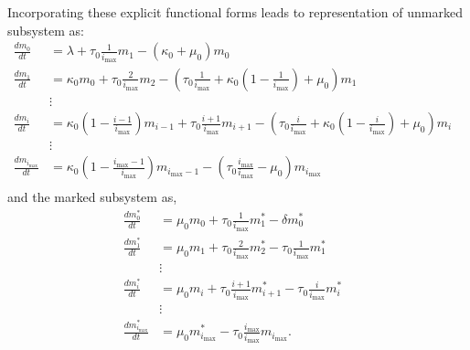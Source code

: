 \documentclass[review]{elsarticle}
\newcommand{\imax}{\ensuremath{i_{\max}}\xspace}
\begin{document}
Incorporating these explicit functional forms leads to representation of unmarked subsystem as: %
\begin{align*}
\frac{dm_{0}}{dt} &= \lambda+\tau_0\frac{1}{\imax} m_{1}-\left(\kappa_0 +\mu_0\right) m_{0} \\
\frac{dm_{1}}{dt} &= \kappa_0 m_{0}+\tau_0\frac{2}{\imax} m_{2}-\left(\tau_0\frac{1}{\imax} +\kappa_0\left(1-\frac{1}{\imax}\right) +\mu_0\right) m_{1}\\
& \vdots & \\
\frac{dm_{i}}{dt} &= \kappa_0\left(1-\frac{i-1}{\imax}\right) m_{i-1}+\tau_0\frac{i+1}{\imax} m_{i+1}-\left(\tau_0\frac{i}{\imax}+\kappa_0\left(1-\frac{i}{\imax}\right) + \mu_0\right) m_{i} \\
& \vdots & \\
\frac{dm_{\imax}}{dt} &= \kappa_0\left(1-\frac{\imax-1}{\imax}\right) m_{\imax-1}-\left(\tau_0\frac{\imax}{\imax} -\mu_0\right) m_{\imax} \\
\end{align*}
and the marked subsystem as,
\begin{align*}
\frac{dm_{0}^{*}}{dt} &= \mu_0 m_{0}+\tau_0\frac{1}{\imax} m_{1}^{*}-\delta m_{0}^{*} \\
\frac{dm_{1}^{*}}{dt} &= \mu_0 m_{1}+\tau_0\frac{2}{\imax} m_{2}^{*}- \tau_0\frac{1}{\imax} m_{1}^{*} \\
& \vdots & \\
\frac{dm_{i}^{*}}{dt} &= \mu_0 m_{i}+\tau_0\frac{i+1}{\imax} m_{i+1}^{*}-\tau_0\frac{i}{\imax}m_{i}^{*} \\
& \vdots & \\
\frac{dm_{\imax}^{*}}{dt} &= \mu_0 m_{\imax}^{*}-\tau_0\frac{\imax}{\imax} m_{\imax}. \\
\end{align*}
\end{document}
